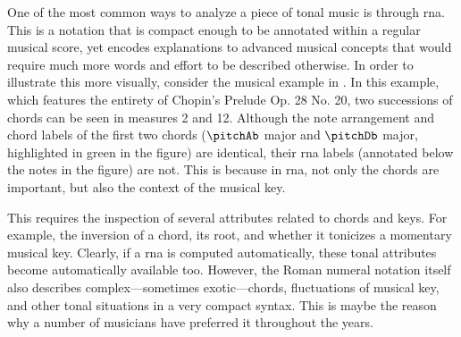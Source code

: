 
One of the most common ways to analyze a piece of tonal
music is through \gls{rna}. This is a notation that is
compact enough to be annotated within a regular musical
score, yet encodes explanations to advanced musical concepts
that would require much more words and effort to be
described otherwise. In order to illustrate this more
visually, consider the musical example in
. In this example, which
features the entirety of Chopin's Prelude Op. 28 No. 20, two
successions of chords can be seen in measures 2 and 12.
Although the note arrangement and chord labels of the first
two chords ($\pitchAb$ major and $\pitchDb$ major,
highlighted in green in the figure) are identical, their
\gls{rna} labels (annotated below the notes in the figure)
are not. This is because in \gls{rna}, not only the chords
are important, but also the context of the musical key.


This requires the inspection of several attributes related
to chords and keys. For example, the inversion of a chord,
its root, and whether it tonicizes a momentary musical key.
Clearly, if a \gls{rna} is computed automatically, these
tonal attributes become automatically available too.
However, the Roman numeral notation itself also describes
complex---sometimes exotic---chords, fluctuations of musical
key, and other tonal situations in a very compact syntax.
This is maybe the reason why a number of musicians have
preferred it throughout the years. 




